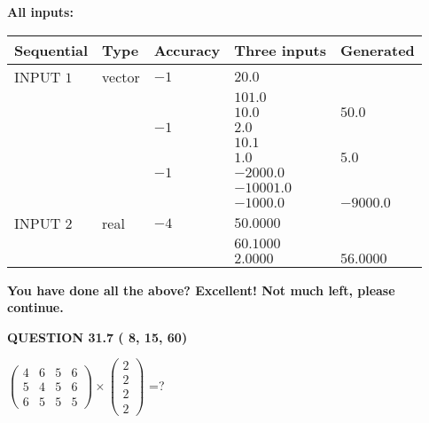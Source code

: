 \documentclass[12pt]{article}
\begin{document}
   
   
   
\noindent\vspace{0.1in}\hspace{-0.08in} {\textbf{\Large{All inputs: }}}
   
   
  
  
\noindent\begin{tabular}{|l|l|l|l|l|}
\hline
 Sequential & Type & Accuracy & Three inputs & Generated \\ 
\hline
 
 
  INPUT $           1$ & vector & $          -1 $ & $
20.0
  $ & \\
  & & & $
101.0
  $ & \\
  & & & $
10.0
$ & $ 50.0 $ 
  \\
  & & $          -1 $ & $
2.0
  $ & \\
  & & & $
10.1
  $ & \\
  & & & $
1.0
$ & $ 5.0 $ 
  \\
  & & $          -1 $ & $
-2000.0
  $ & \\
  & & & $
-10001.0
  $ & \\
  & & & $
-1000.0
$ & $ -9000.0 $ 
 \\  \hline  
 
 
  INPUT $           2$ & real & $          -4 $ & $
 50.0000
  $ & \\
  & & &  $
 60.1000
  $ & \\
  & & &  $
 2.0000
 $ & $ 56.0000 $ 
 \\  \hline  
 \end{tabular}
   
   
   
   
\vspace{0.3in}
{\textbf{\LARGE{You have done all the above? Excellent! Not much left, please continue.}}}
\vspace{0.3in}
   
   
  
\vspace{0.2in}
  
{\textbf{\Large{QUESTION
31.7 
 (          8,         15,         60)
}}}
  
  
 
$ \left( \begin{array}{ccccccccc}
           4 & 
           6 & 
           5 & 
           6 \\ 
           5 & 
           4 & 
           5 & 
           6 \\ 
           6 & 
           5 & 
           5 & 
           5
\end{array}\right) \times
\left( \begin{array}{c}
           2 \\ 
           2 \\ 
           2 \\ 
           2
\end{array}\right) $ =?
 
\end{document}
